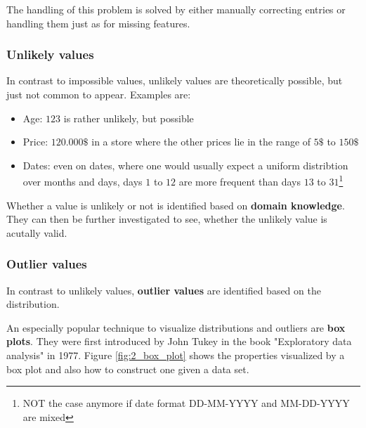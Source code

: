 The handling of this problem is solved by either manually correcting entries or handling them just as for missing features.

\subsubsection*{Unlikely values}
In contrast to impossible values, unlikely values are theoretically possible, but just not common to appear. Examples are:
\begin{itemize}
  \item Age: $123$ is rather unlikely, but possible
  \item Price: $120.000\$$ in a store where the other prices lie in the range of $5\$$ to $150\$$
  \item Dates: even on dates, where one would usually expect a uniform distribtion over months and days, days $1$ to $12$ are more frequent than days $13$ to $31$\footnote{NOT the case anymore if date format \textcolor{mathblue}{DD-MM-YYYY} and \textcolor{mathblue}{MM-DD-YYYY} are mixed}
\end{itemize}
Whether a value is unlikely or not is identified based on \textbf{domain knowledge}. They can then be further investigated to see, whether the unlikely value is acutally valid.


\subsubsection*{Outlier values}
In contrast to unlikely values, \textbf{outlier values} are identified based on the distribution. 

An especially popular technique to visualize distributions and outliers are \textbf{box plots}. They were first introduced by John Tukey in the book "Exploratory data analysis" in 1977. Figure \ref{fig:2_box_plot} shows the properties visualized by a box plot and also how to construct one given a data set. 

